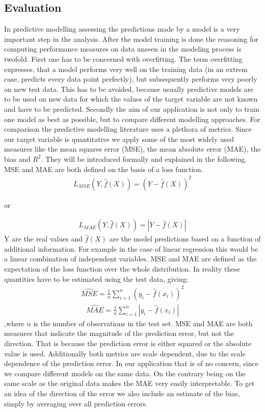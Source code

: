 \subsection{Evaluation}\label{sec:Evaluation_Theory}
In predictive modelling assessing the predictions made by a model is a very important step in the analysis. After the model training is done the reasoning for computing performance measures on data unseen in the modeling process is twofold. First one has to be concerned with overfitting. The term overfitting expresses, that a model performs very well on the training data (in an extrem case, predicts every data point perfectly), but subsequently performs very poorly on new test data. This has to be avoided, because usually predictive models are to be used on new data for which the values of the target variable are not known and have to be predicted. Secondly the aim of our application is not only to train one model as best as possible, but to compare different modelling approaches. For comparison the predictive modelling literature uses a plethora of metrics. Since our target variable is quantitative we apply some of the most widely used measures like the mean squares error (MSE), the mean absolute error (MAE), the bias and $R^2$. They will be introduced formally and explained in the following. MSE and MAE are both defined on the basis of a loss function. 
\begin{align}
L_{MSE}(Y,\hat{f}(X))=(Y-\hat{f}(X))^2
\end{align}
\begin{center}
or
\end{center}
\begin{align*}
L_{MAE}(Y,\hat{f}(X))=|Y-\hat{f}(X)|
\end{align*}
Y are the real values and $\hat{f}(X)$ are the model predictions based on a function of additional information. For example in the case of linear regression this would be a linear combination of independent variables. MSE and MAE are defined as the expectation of the loss function over the whole distribution. In reality these quantities have to be estimated using the test data, giving:
\begin{align}
\hat{MSE}=\frac{1}{n}\sum_{i=1}^n(y_i-\hat{f}(x_i))^2
\end{align}
\begin{align}
\hat{MAE}=\frac{1}{n}\sum_{i=1}^n|y_i-\hat{f}(x_i)|
\end{align}
,where $n$ is the number of observations in the test set. MSE and MAE are both measures that indicate the magnitude of the prediction error, but not the direction. That is because the prediction error is either squared or the absolute value is used. Additionally both metrics are scale dependent, due to the scale dependence of the prediction error. In our application that is of no concern, since we compare different models on the same data. On the contrary being on the same scale as the original data makes the MAE very easily interpretable. To get an idea of the direction of the error we also include an estimate of the bias, simply by averaging over all prediction errors.
